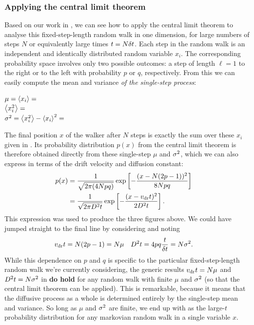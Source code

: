 \newpage %
\subsubsection{\label{sec:RW_CLT}Applying the central limit theorem}
Based on our work in , we can see how to apply the central limit theorem to analyse this fixed-step-length random walk in one dimension, for large numbers of steps $N$ or equivalently large times $t = N \delta t$.
Each step in the random walk is an independent and identically distributed random variable $x_i$.
The corresponding probability space involves only two possible outcomes: a step of length $\ell = 1$ to the right or to the left with probability $p$ or $q$, respectively.
From this we can easily compute the mean and variance \textit{of the single-step process}:
\begin{mdframed}
  $\mu = \left\langle x_i \right\rangle = $ \\[33 pt]
  $\left\langle x_i^2 \right\rangle = $ \\[33 pt]
  $\sigma^2 = \left\langle x_i^2 \right\rangle - \left\langle x_i \right\rangle^2 = $ \\[30 pt]
\end{mdframed}

The final position $x$ of the walker after $N$ steps is exactly the sum over these $x_i$ given in .
Its probability distribution $p(x)$ from the central limit theorem is therefore obtained directly from these single-step $\mu$ and $\sigma^2$, which we can also express in terms of the drift velocity and diffusion constant:
\begin{align}
  p(x) & = \frac{1}{\sqrt{2\pi (4Npq)}} \exp\left[-\frac{(x - N(2p - 1))^2}{8Npq}\right] \cr
       & = \frac{1}{\sqrt{2\pi D^2 t}} \exp\left[-\frac{(x - v_{\mathrm{dr}} t)^2}{2D^2 t}\right]. \label{eq:RW_CLT}
\end{align}
This expression was used to produce the three figures above.
We could have jumped straight to the final line by considering  and noting
\begin{align}
  \label{eq:single_step}
  v_{\mathrm{dr}} t & = N(2p - 1) = N \mu &
  D^2 t & = 4pq \frac{t}{\delta t} = N \sigma^2.
\end{align}
While this dependence on $p$ and $q$ is specific to the particular fixed-step-length random walk we're currently considering, the generic results $v_{\mathrm{dr}} t = N \mu$ and $D^2 t = N \sigma^2$ in  \textbf{do hold} for any random walk with finite $\mu$ and $\sigma^2$ (so that the central limit theorem can be applied).
This is remarkable, because it means that the diffusive process as a whole is determined entirely by the single-step mean and variance.
So long as $\mu$ and $\sigma^2$ are finite, we end up with  as the large-$t$ probability distribution for any markovian random walk in a single variable $x$.

